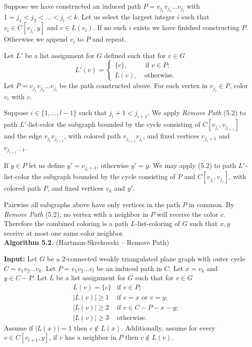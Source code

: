 \documentclass[letterpaper, 12pt]{article}
\theoremstyle{definition}
\theoremstyle{definition}
\theoremstyle{thm}
\theoremstyle{definition}
\begin{document}
Suppose we have constructed an induced path $P=v_{j_1}v_{j_2}\ldots v_{j_l}$
with $1=j_1<j_2<\ldots<j_l< k$. Let us select the largest integer $i$ such
that $v_i\in C[v_{j_l},y]$ and $c\in L(v_i)$. If no such $i$ exists we have
finished constructing $P$. Otherwise we append $v_i$ to $P$ and repeat.

Let $L'$ be a list assignment for $G$ defined such that for $v\in G$
\[
	L'(v) = \begin{cases}
				\{c\}, & \text{ if } v\in P;\\
				L(v), & \ \text{otherwise}.
			\end{cases}
\]
Let $P=v_{j_1}v_{j_2}\ldots v_{j_l}$ be the path constructed above.
For each vertex in $v_{j_i}\in P$, color $v_i$ with $c$.

Suppose
$i\in\{1,\ldots,l-1\}$ such that $j_i+1<j_{i+1}$. We apply \textit{Remove Path}
(5.2) to path $L'$-list-color the subgraph bounded by the cycle consisting of
$C[v_{j_i},v_{j_{i+1}}]$ and the edge $v_{j_i}v_{j_{i+1}}$, with colored path
$v_{j_{i+1}}v_{j_i}$, and fixed vertices $v_{j_i+1}$ and $v_{j_{i+1}-1}$.

If $y\in P$ let us define $y'=v_{j_l+1}$, otherwise $y'=y$.
We may apply  (5.2) to path $L'$-list-color the
subgraph bounded by the cycle consisting of $P$ and $C[v_{j_l},v_{j_1}]$, with
colored path $P$, and fixed vertices $v_k$ and $y'$.

Pairwise all subgraphs above have only vertices in the path $P$ in common.
By \textit{Remove Path} (5.2), no vertex with a neighbor in $P$ will
receive the color $c$. Therefore the combined coloring is a path
$L$-list-coloring of $G$ such that $x,y$ receive at most one same color
neighbor.\\

\noindent\textbf{Algorithm 5.2.} (Hartman-Skrekovski -- Remove Path)

\noindent\textbf{Input:} Let $G$ be a $2$-connected weakly triangulated plane
graph with outer cycle $C=v_1v_2\ldots v_k$. Let $P=v_1v_2\ldots v_l$ be an
induced path in $C$. Let $x=v_k$ and $y\in C-P$. Let $L$ be a list
assignment for $G$ such that for $v\in G$
\[
    \begin{array}{ll}
        L(v)=\{c\} & \text{if } v\in P;\\
	    |L(v)|\ge 1 & \text{if } v=x \text{ or } v=y;\\
	    |L(v)|\ge 2 & \text{if } v\in C-P-x-y;\\
	    |L(v)|\ge 3 & \text{otherwise.}
    \end{array}
\]
Assume if $|L(x)|=1$ then $c\not\in L(x)$. Additionally, assume for every
$v\in C[v_{l+1},y]$, if $v$ has a neighbor in $P$ then $c\not\in L(v)$.
\end{document}
